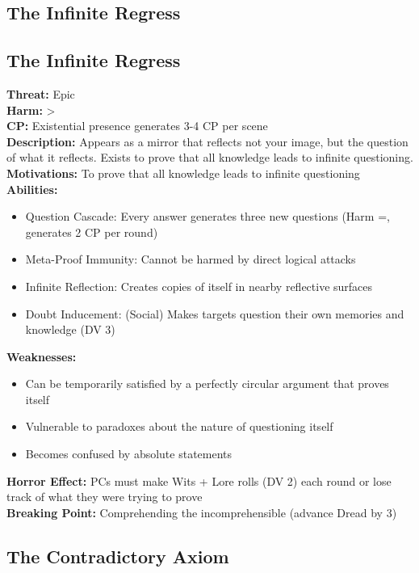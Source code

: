 \documentclass[11pt]{article}
\newenvironment{monsterentry}[1]{%
  \begin{mdframed}[backgroundcolor=shadecolor, linewidth=0pt, leftmargin=0pt, rightmargin=0pt]%
  \subsection*{#1}%
}{%
  \end{mdframed}%
}
\begin{document}
\subsection{The Infinite Regress}

\begin{monsterentry}{The Infinite Regress}
\textbf{Threat:} Epic \\
\textbf{Harm:} \textgreater \\
\textbf{CP:} Existential presence generates 3-4 CP per scene \\
\textbf{Description:} Appears as a mirror that reflects not your image, but the question of what it reflects. Exists to prove that all knowledge leads to infinite questioning. \\
\textbf{Motivations:} To prove that all knowledge leads to infinite questioning \\
\textbf{Abilities:}
\begin{itemize}
\item Question Cascade: Every answer generates three new questions (Harm =, generates 2 CP per round)
\item Meta-Proof Immunity: Cannot be harmed by direct logical attacks
\item Infinite Reflection: Creates copies of itself in nearby reflective surfaces
\item Doubt Inducement: (Social) Makes targets question their own memories and knowledge (DV 3)
\end{itemize}
\textbf{Weaknesses:}
\begin{itemize}
\item Can be temporarily satisfied by a perfectly circular argument that proves itself
\item Vulnerable to paradoxes about the nature of questioning itself
\item Becomes confused by absolute statements
\end{itemize}
\textbf{Horror Effect:} PCs must make Wits + Lore rolls (DV 2) each round or lose track of what they were trying to prove \\
\textbf{Breaking Point:} Comprehending the incomprehensible (advance Dread by 3)
\end{monsterentry}

\subsection{The Contradictory Axiom}
\end{document}
